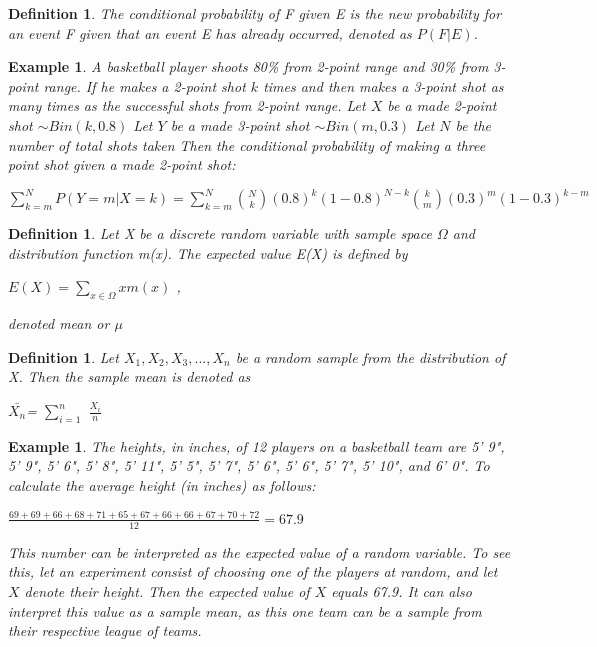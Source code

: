 \documentclass[11pt,a4paper]{article}
\theoremstyle{plain}
\newtheorem{de}[fact]{Definition}
\newtheorem{exmp}[fact]{Example}
\begin{document}
\begin{de}
The conditional probability of F given E  is the new probability for an event F given that an event E has already occurred, denoted as $P(F|E)$.
\end{de}
\begin{exmp}
A basketball player shoots 80\% from 2-point range and 30\% from 3-point range. If he makes a 2-point shot $k$ times and then makes a 3-point shot as many times as the successful shots from 2-point range.
\newline Let $X$ be a made 2-point shot $\sim Bin(k,0.8)$
\newline Let $Y$ be a made 3-point shot $\sim Bin(m,0.3)$
\newline Let $N$ be the number of total shots taken
\newline Then the conditional probability of making a three point shot given a made 2-point shot:
\newline \begin{center}
$\displaystyle\sum_{k=m}^N P(Y=m|X=k)=\displaystyle\sum_{k=m}^N \binom{N}{k}(0.8)^k(1-0.8)^{N-k}\binom{k}{m}(0.3)^m(1-0.3)^{k-m}$
\end{center}
\end{exmp}


\begin{de}
Let X be a discrete random variable with sample space $\Omega$ and distribution function m(x). The expected value E(X) is defined by 
\begin{center}{$E(X) =\displaystyle\sum_{x\in\Omega} xm(x)$ },
\end {center}
denoted mean or $\mu$
\end{de}

\begin{de}
Let $X_1,X_2,X_3,...,X_n$ be a random sample from the distribution of X. Then the sample mean is denoted as
\begin{center}$\bar{X_n}$= $\displaystyle\sum_{i=1}^n$ $\frac{X_i}{n}$
\end{center}
\end{de}

\begin{exmp}
The heights, in inches, of 12 players on a basketball team are 5' 9", 5' 9", 5' 6", 5' 8", 5' 11", 5' 5", 5' 7", 5' 6", 5' 6", 5' 7", 5' 10", and 6' 0". 
To calculate the average height (in inches) as follows:
\begin{center}
$\frac{69+69+66+68+71+65+67+66+66+67+70+72}{12}=67.9$
\end{center}
This number can be interpreted as the expected value of a random variable. To see this, let an experiment consist of choosing one of the players at random, and let $X$ denote their height. Then the expected value of $X$ equals 67.9. It can also interpret this value as a sample mean, as this one team can be a sample from their respective league of teams.
\end{exmp}
\end{document}
